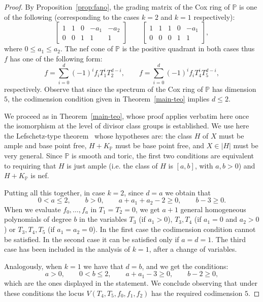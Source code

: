 \documentclass{amsart}
\theoremstyle{definition}
\theoremstyle{remark}
\begin{document}
\begin{proof}
By Proposition~\ref{prop:fano},
the grading matrix of the Cox ring
of $\mathbb{P}$ is one of the following
(corresponding to the cases $k=2$ and $k=1$
respectively):
\[
 \left[
 \begin{array}{ccccc}
  1  & 1 & 0 & -a_1 & -a_2\\
  0  & 0 & 1 & 1 &  1
 \end{array}
 \right]
 \qquad
 \left[
 \begin{array}{ccccc}
  1  & 1 & 1 & 0 & -a_1\\
  0  & 0 & 0 & 1 & 1
 \end{array}
 \right],
\]
where $0\leq a_1\leq a_2$.
The nef cone of $\mathbb{P}$ is the positive quadrant in both cases thus $f$
has one of the following form:
\[
 f = \sum_{i=0}^d(-1)^if_iT_1^iT_2^{d-i},
 \qquad
 f = \sum_{i=0}^d(-1)^if_iT_4^iT_5^{d-i},
\]
respectively. Observe that since the spectrum
of the Cox ring of $\mathbb P$ has dimension $5$,
the codimension condition given in
Theorem~\ref{main-teo} implies $d\leq 2$.

We proceed as in Theorem~\ref{main-teo}, whose proof applies verbatim here once the isomorphism at the level of divisor class groups is established.
We use here the Lefschetz-type theorem~\cite[Thm. 1]{rs2}
whose hypotheses are: the class $H$ of $X$ must be ample and base point free, $H + K_{\mathbb{P}}$ must be base point free, and $X \in |H|$ must be very general. Since $\mathbb{P}$ is smooth and toric, the first two conditions are equivalent to requiring that $H$ is just ample
(i.e. the class of $H$ is $[a,b]$, with $a,b > 0$)
and $H + K_{\mathbb{P}}$ is nef.

Putting all this together, in case
$k=2$, since $d = a$ we obtain that
\[
 0<a\leq 2,
 \qquad
 b>0,
 \qquad
 a+a_1+a_2-2\geq 0,
 \qquad
 b-3\geq 0.
\]
When we evaluate $f_0,\dots,f_a$ in $T_1=T_2=0$,
we get $a+1$ general homogeneous polynomials
of degree $b$ in the variables $T_3$ (if $a_1>0$),
$T_3,T_4$ (if $a_1=0$ and $a_2>0$) or
$T_3,T_4,T_5$ (if $a_1=a_2=0$).
In the first case the codimension condition
cannot be satisfied. In the second case it
can be satisfied only if $a = d = 1$.
The third case has been included in
the analysis of $k=1$, after a change
of variables.

Analogously, when $k=1$ we have that $d = b$, and
we get the conditions:
\[
 a>0,
 \qquad
 0 < b \leq 2,
 \qquad
 a+a_1-3\geq 0,
 \qquad
 b-2\geq 0,
\]
which are the ones displayed in the statement.
We conclude observing that under these conditions
the locus $V(T_4,T_5,f_0,f_1,f_2)$ has
the required codimension $5$.
\end{proof}
\end{document}
